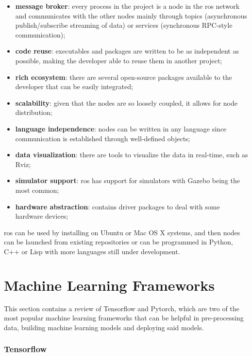 \begin{itemize}
    \item \textbf{message broker}: every process in the project is a node in the \acs{ros} network and communicates with the other nodes mainly through topics (asynchronous publish/subscribe streaming of data) or services (synchronous RPC-style communication);
    \item \textbf{code reuse}: executables and packages are written to be as independent as possible, making the developer able to reuse them in another project;
    \item \textbf{rich ecosystem}: there are several open-source packages available to the developer that can be easily integrated;
    \item \textbf{scalability}: given that the nodes are so loosely coupled, it allows for node distribution;
    \item \textbf{language independence}: nodes can be written in any language since communication is established through well-defined objects;
    \item \textbf{data visualization}: there are tools to visualize the data in real-time, such as Rviz;
    \item \textbf{simulator support}: \acs{ros} has support for simulators with Gazebo being the most common;
    \item \textbf{hardware abstraction}: contains driver packages to deal with some hardware devices;
\end{itemize}

\acs{ros} can be used by installing on Ubuntu or Mac OS X systems, and then nodes can be launched from existing repositories or can be programmed in Python, C++ or Lisp with more languages still under development.

\section{Machine Learning Frameworks}

This section contains a review of Tensorflow and Pytorch, which are two of the most popular machine learning frameworks that can be helpful in pre-processing data, building machine learning models and deploying said models.

\subsubsection{Tensorflow}

